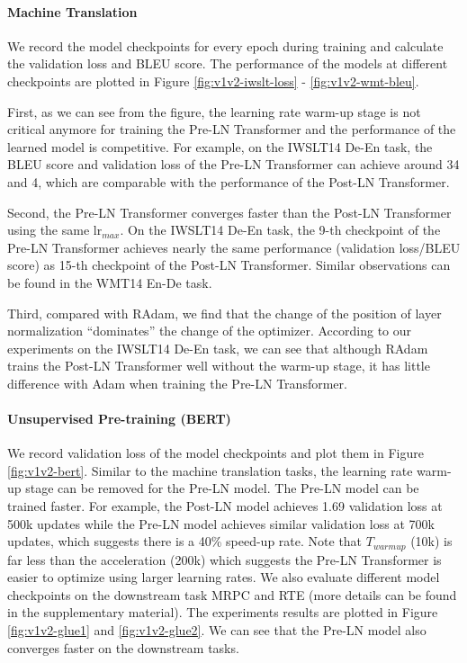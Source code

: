 \documentclass{article}
\begin{document}
\paragraph{Machine Translation}
We record the model checkpoints for every epoch during training and calculate the validation loss and BLEU score.  The performance of the models at different checkpoints are plotted in Figure \ref{fig:v1v2-iwslt-loss} - \ref{fig:v1v2-wmt-bleu}. 

First, as we can see from the figure, the learning rate warm-up stage is not critical anymore for training the Pre-LN Transformer and the performance of the learned model is competitive. For example, on the IWSLT14 De-En task, the BLEU score and validation loss of the Pre-LN Transformer can achieve around 34 and 4, which are comparable with the performance of the Post-LN Transformer. 

Second, the Pre-LN Transformer converges faster than the Post-LN Transformer using the same $\text{lr}_{max}$. On the IWSLT14 De-En task, the 9-th checkpoint of the Pre-LN Transformer achieves nearly the same performance (validation loss/BLEU score) as 15-th checkpoint of the Post-LN Transformer. Similar observations can be found in the WMT14 En-De task. 

Third, compared with RAdam, we find that the change of the position of layer normalization ``dominates'' the change of the optimizer. According to our experiments on the IWSLT14 De-En task, we can see that although RAdam trains the Post-LN Transformer well without the warm-up stage, it has little difference with Adam when training the Pre-LN Transformer.  

\paragraph{Unsupervised Pre-training (BERT)}

We record validation loss of the model checkpoints and plot them in Figure \ref{fig:v1v2-bert}. Similar to the machine translation tasks, the learning rate warm-up stage can be removed for the Pre-LN model. The Pre-LN model can be trained faster. For example, the Post-LN model achieves 1.69 validation loss at 500k updates while the Pre-LN model achieves similar validation loss at 700k updates, which suggests there is a 40\% speed-up rate. Note that $T_{warmup}$ (10k) is far less than the acceleration (200k) which suggests the Pre-LN Transformer is easier to optimize using larger learning rates. We also evaluate different model checkpoints on the downstream task MRPC and RTE (more details can be found in the supplementary material). The experiments results are plotted in Figure \ref{fig:v1v2-glue1} and \ref{fig:v1v2-glue2}. We can see that the Pre-LN model also converges faster on the downstream tasks.
\end{document}
